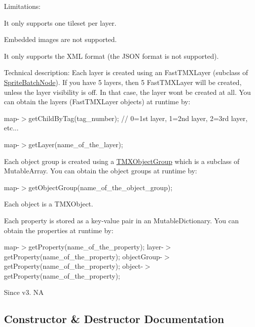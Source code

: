Limitations\+:
\begin{DoxyItemize}
\item It only supports one tileset per layer.
\item Embedded images are not supported.
\item It only supports the X\+ML format (the J\+S\+ON format is not supported).
\end{DoxyItemize}

Technical description\+: Each layer is created using an Fast\+T\+M\+X\+Layer (subclass of \hyperlink{classSpriteBatchNode}{Sprite\+Batch\+Node}). If you have 5 layers, then 5 Fast\+T\+M\+X\+Layer will be created, unless the layer visibility is off. In that case, the layer won\textquotesingle{}t be created at all. You can obtain the layers (Fast\+T\+M\+X\+Layer objects) at runtime by\+:
\begin{DoxyItemize}
\item map-\/$>$get\+Child\+By\+Tag(tag\+\_\+number); // 0=1st layer, 1=2nd layer, 2=3rd layer, etc...
\item map-\/$>$get\+Layer(name\+\_\+of\+\_\+the\+\_\+layer);
\end{DoxyItemize}

Each object group is created using a \hyperlink{classTMXObjectGroup}{T\+M\+X\+Object\+Group} which is a subclass of Mutable\+Array. You can obtain the object groups at runtime by\+:
\begin{DoxyItemize}
\item map-\/$>$get\+Object\+Group(name\+\_\+of\+\_\+the\+\_\+object\+\_\+group);
\end{DoxyItemize}

Each object is a T\+M\+X\+Object.

Each property is stored as a key-\/value pair in an Mutable\+Dictionary. You can obtain the properties at runtime by\+:

map-\/$>$get\+Property(name\+\_\+of\+\_\+the\+\_\+property); layer-\/$>$get\+Property(name\+\_\+of\+\_\+the\+\_\+property); object\+Group-\/$>$get\+Property(name\+\_\+of\+\_\+the\+\_\+property); object-\/$>$get\+Property(name\+\_\+of\+\_\+the\+\_\+property);

\begin{DoxySince}{Since}
v3.  NA 
\end{DoxySince}


\subsection{Constructor \& Destructor Documentation}
\mbox{\label{classexperimental_1_1TMXTiledMap_a4908e56e25f32661814cf96d7fb12e0a}} 
